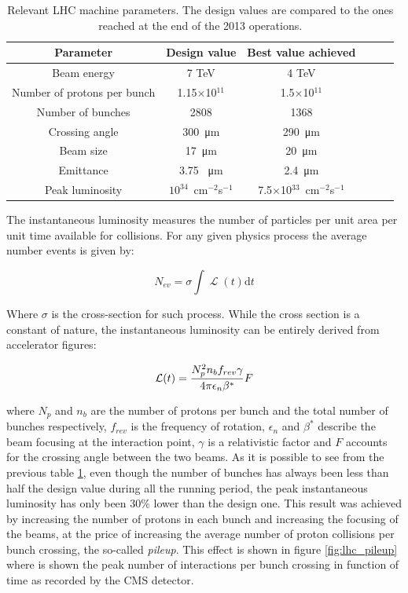 \begin{table}[h!]
   \centering
\begin{tabular}{c|ccccc}
\hline
Parameter & Design value&  Best value achieved \\ 
\hline
Beam energy   & 7 TeV & 4 TeV \\ 
Number of protons per bunch & 1.15$\times$10$^{11}$ & 1.5$\times$10$^{11}$ \\
Number of bunches & 2808 & 1368 \\
Crossing angle & 300~\si{\micro\metre} & 290~\si{\micro\metre} \\
Beam size & 17~\si{\micro\metre} & 20~\si{\micro\metre} \\
Emittance & 3.75 ~\si{\micro\metre} & 2.4~\si{\micro\metre}  \\
Peak luminosity & $10^{34}$~cm$^{-2}$s$^{-1}$ & 7.5$\times$10$^{33}$~cm$^{-2}$s$^{-1}$ \\
\hline
\end{tabular}
  \caption{Relevant LHC machine parameters. The design values are compared to the ones reached at the end of the 2013 operations.}
  \label{tab:lhc_figures}                
\end{table}


The instantaneous luminosity measures the number of particles per unit area per unit time available for collisions. For any given physics process the average number events is given by:

\begin{equation} 
	N_{ev} = \sigma\int\operatorname{\mathcal{L}}(t)\mathrm{d}t
	\label{eq:n_events}
\end{equation} 

Where $\sigma$ is the cross-section for such process. While the cross section is a constant of nature, the instantaneous luminosity can be entirely derived from accelerator figures:

\begin{equation} 
	\operatorname{{\cal L}}(t) = \frac{N_p^2 n_b f_{rev} \gamma }{4 \pi \epsilon_{n} \beta^*} F
	\label{eq:lumi}
\end{equation} 

where $N_p$ and $n_b$ are the number of protons per bunch and the total number of bunches respectively, $f_{rev}$ is the frequency of rotation, $\epsilon_{n}$ and $\beta^*$ describe the beam focusing at the interaction point, $\gamma$ is a relativistic factor and $F$ accounts for the crossing angle between the two beams. As it is possible to see from the previous table \ref{tab:lhc_figures}, even though the number of bunches has always been less than half the design value during all the running period, the peak instantaneous luminosity has only been 30\% lower than the design one. This result was achieved by increasing the number of protons in each bunch and increasing the focusing of the beams, at the price of increasing the average number of proton collisions per bunch crossing, the so-called \emph{pileup}. This effect is shown in figure \ref{fig:lhc_pileup} where is shown the peak number of interactions per bunch crossing in function of time as recorded by the CMS detector.

